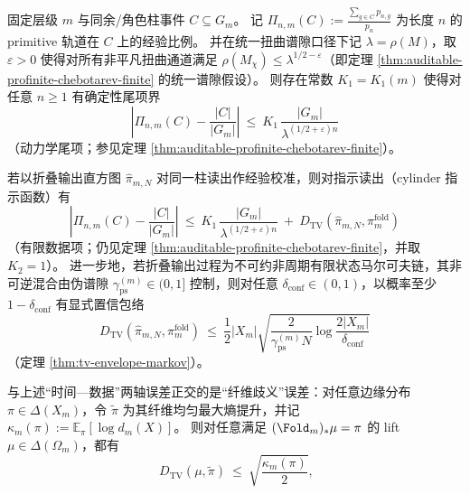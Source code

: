 \begin{theorem}\label{thm:prefix-readout-orthogonal-error-decomposition}
固定层级 \(m\) 与同余/角色柱事件 \(C\subseteq G_m\)。
记 \(\Pi_{n,m}(C):=\frac{\sum_{g\in C}p_{n,g}}{p_n}\) 为长度 \(n\) 的 primitive 轨道在 \(C\) 上的经验比例。
并在统一扭曲谱隙口径下记 \(\lambda=\rho(M)\)，取 \(\varepsilon>0\) 使得对所有非平凡扭曲通道满足 \(\rho(M_\chi)\le \lambda^{1/2-\varepsilon}\)（即定理 \ref{thm:auditable-profinite-chebotarev-finite} 的统一谱隙假设）。
则存在常数 \(K_1=K_1(m)\) 使得对任意 \(n\ge 1\) 有确定性尾项界
\begin{equation}\label{eq:prefix-tail-term}
\boxed{\;
\left|\Pi_{n,m}(C)-\frac{|C|}{|G_m|}\right|
\ \le\
K_1\,\frac{|G_m|}{\lambda^{(1/2+\varepsilon)n}}\;}
\end{equation}
（动力学尾项；参见定理 \ref{thm:auditable-profinite-chebotarev-finite}）。
\par
若以折叠输出直方图 \(\hat{\pi}_{m,N}\) 对同一柱读出作经验校准，则对指示读出（cylinder 指示函数）有
\begin{equation}\label{eq:prefix-tail-plus-data}
\boxed{\;
\left|\Pi_{n,m}(C)-\frac{|C|}{|G_m|}\right|
\ \le\
K_1\,\frac{|G_m|}{\lambda^{(1/2+\varepsilon)n}}
\ +\
D_{\mathrm{TV}}(\hat{\pi}_{m,N},\pi_m^{\mathrm{fold}})\;}
\end{equation}
（有限数据项；仍见定理 \ref{thm:auditable-profinite-chebotarev-finite}，并取 \(K_2=1\)）。
进一步地，若折叠输出过程为不可约非周期有限状态马尔可夫链，其非可逆混合由伪谱隙 \(\gamma_{\mathrm{ps}}^{(m)}\in(0,1]\) 控制，则对任意 \(\delta_{\mathrm{conf}}\in(0,1)\)，以概率至少 \(1-\delta_{\mathrm{conf}}\) 有显式置信包络
\begin{equation}\label{eq:prefix-data-envelope}
\boxed{\;
D_{\mathrm{TV}}(\hat{\pi}_{m,N},\pi_m^{\mathrm{fold}})
\ \le\
\frac12|X_m|\sqrt{\frac{2}{\gamma_{\mathrm{ps}}^{(m)}N}\log\frac{2|X_m|}{\delta_{\mathrm{conf}}}}\;}
\end{equation}
（定理 \ref{thm:tv-envelope-markov}）。
\par
与上述“时间—数据”两轴误差正交的是“纤维歧义”误差：对任意边缘分布 \(\pi\in\Delta(X_m)\)，令 \(\widetilde\pi\) 为其纤维均匀最大熵提升，并记
\(
\kappa_m(\pi):=\mathbb{E}_\pi[\log d_m(X)]
\)。
则对任意满足 \((\Fold_m)_*\mu=\pi\) 的 lift \(\mu\in\Delta(\Omega_m)\)，都有
\begin{equation}\label{eq:prefix-fiber-term}
\boxed{\;
D_{\mathrm{TV}}(\mu,\widetilde\pi)\ \le\ \sqrt{\frac{\kappa_m(\pi)}{2}},
}
\end{equation}
\end{theorem}
